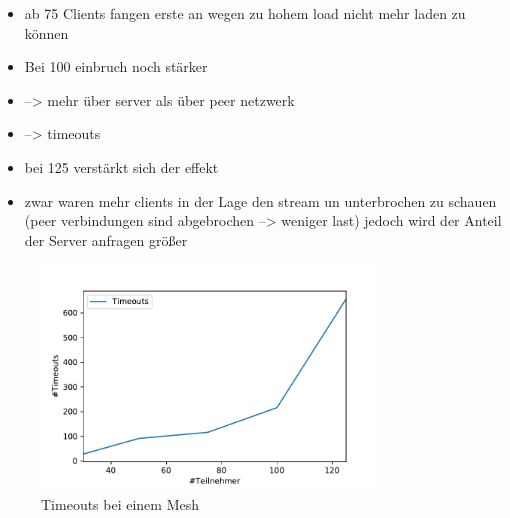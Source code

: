 \begin{itemize}
	\item ab 75 Clients fangen erste an wegen zu hohem load nicht mehr laden zu können
	\item Bei 100 einbruch noch stärker
	\item --> mehr über server als über peer netzwerk
	\item --> timeouts
	\item bei 125 verstärkt sich der effekt
	\item zwar waren mehr clients in der Lage den stream un unterbrochen zu schauen (peer verbindungen sind abgebrochen --> weniger last) jedoch wird der Anteil der Server anfragen größer
\end{itemize}

\begin{figure}[!h]
	\centering
	\includegraphics[width=0.8\textwidth]{figures/timeouts_single}
	\caption[A Figure Short-Title]{Timeouts bei einem Mesh}
	\label{fig:timeouts_single}
\end{figure}

